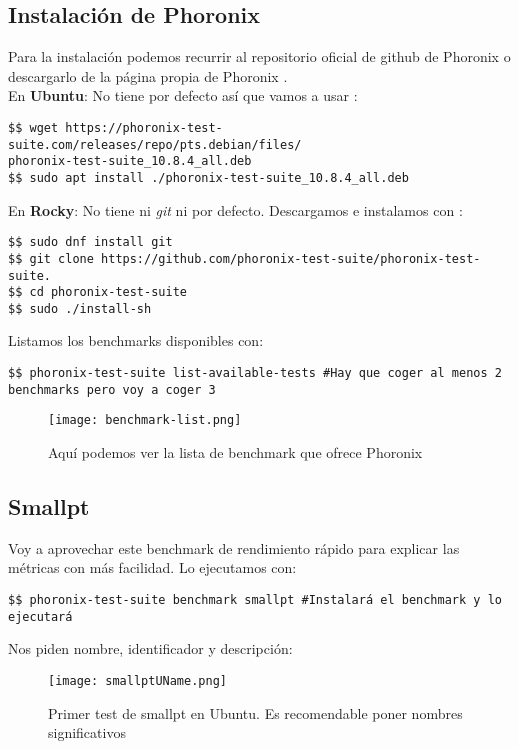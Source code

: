 \subsection{Instalación de Phoronix}
Para la instalación podemos recurrir al repositorio oficial de github de Phoronix \cite{rephoronix} o descargarlo de la página propia de Phoronix \cite{webphoronix}.\\

En \textbf{Ubuntu}: No tiene  por defecto así que vamos a usar :
\begin{verbatim}
$$ wget https://phoronix-test-suite.com/releases/repo/pts.debian/files/
phoronix-test-suite_10.8.4_all.deb
$$ sudo apt install ./phoronix-test-suite_10.8.4_all.deb
\end{verbatim}

En \textbf{Rocky}: No tiene ni \emph{git} ni  por defecto. Descargamos e instalamos con :
\begin{verbatim}
$$ sudo dnf install git
$$ git clone https://github.com/phoronix-test-suite/phoronix-test-suite.
$$ cd phoronix-test-suite
$$ sudo ./install-sh
\end{verbatim}

 Listamos los benchmarks disponibles con:
\begin{verbatim}
$$ phoronix-test-suite list-available-tests #Hay que coger al menos 2 benchmarks pero voy a coger 3
\end{verbatim}

\begin{figure}[H]
	\centering
	\texttt{[image: benchmark-list.png]}
	\caption{Aquí podemos ver la lista de benchmark que ofrece Phoronix \cite{rephoronix}}
\end{figure}

\subsection{Smallpt}
Voy a aprovechar este benchmark de rendimiento rápido para explicar las métricas con más facilidad.
Lo ejecutamos con:
\begin{verbatim}
$$ phoronix-test-suite benchmark smallpt #Instalará el benchmark y lo ejecutará
\end{verbatim} 

\newpage

Nos piden nombre, identificador y descripción:
\begin{figure}[H]
	\centering
	\texttt{[image: smallptUName.png]}
	\caption{Primer test de smallpt en Ubuntu. Es recomendable poner nombres significativos}
\end{figure}

